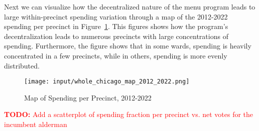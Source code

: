 Next we can visualize how the decentralized nature of the menu program leads to large within-precinct spending variation through a map of the 2012-2022 spending per precinct in Figure~\ref{fig:spending_map}.
This figures shows how the program's decentralization leads to numerous precincts with large concentrations of spending.
Furthermore, the figure shows that in some wards, spending is heavily concentrated in a few precincts, while in others, spending is more evenly distributed.

\begin{figure}[H]
    \centering
    \texttt{[image: input/whole\_chicago\_map\_2012\_2022.png]}
    \caption{Map of Spending per Precinct, 2012-2022}
    \label{fig:spending_map}
\end{figure}

\textcolor{red}{\textbf{TODO:} Add a scatterplot of spending fraction per precinct vs. net votes for the incumbent alderman}
